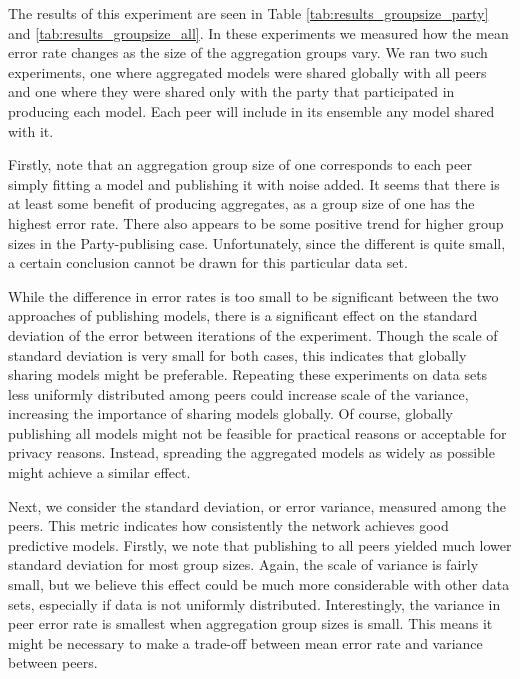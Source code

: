 The results of this experiment are seen in Table \ref{tab:results_groupsize_party} and \ref{tab:results_groupsize_all}. In these experiments we measured how the mean error rate changes as the size of the aggregation groups vary. We ran two such experiments, one where aggregated models were shared globally with all peers and one where they were shared only with the party that participated in producing each model. Each peer will include in its ensemble any model shared with it.

Firstly, note that an aggregation group size of one corresponds to each peer simply fitting a model and publishing it with noise added. It seems that there is at least some benefit of producing aggregates, as a group size of one has the highest error rate. There also appears to be some positive trend for higher group sizes in the Party-publising case. Unfortunately, since the different is quite small, a certain conclusion cannot be drawn for this particular data set.

While the difference in error rates is too small to be significant between the two approaches of publishing models, there is a significant effect on the standard deviation of the error between iterations of the experiment. Though the scale of standard deviation is very small for both cases, this indicates that globally sharing models might be preferable. Repeating these experiments on data sets less uniformly distributed among peers could increase scale of the variance, increasing the importance of sharing models globally. Of course, globally publishing all models might not be feasible for practical reasons or acceptable for privacy reasons. Instead, spreading the aggregated models as widely as possible might achieve a similar effect.

Next, we consider the standard deviation, or error variance, measured among the peers. This metric indicates how consistently the network achieves good predictive models. Firstly, we note that publishing to all peers yielded much lower standard deviation for most group sizes. Again, the scale of variance is fairly small, but we believe this effect could be much more considerable with other data sets, especially if data is not uniformly distributed. Interestingly, the variance in peer error rate is smallest when aggregation group sizes is small. This means it might be necessary to make a trade-off between mean error rate and variance between peers.

